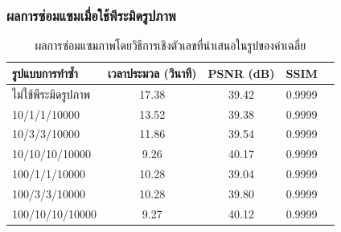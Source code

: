 \documentclass[xcolor=dvipsnames, xetex,serif]{beamer}
\numberwithin{equation}{section}
\begin{document}
    \begin{frame}
        \frametitle{ผลการซ่อมแซมเมื่อใช้พีระมิดรูปภาพ}
        \begin{table}[H]
            \centering
            \begin{tabular}[ht]{|l|c|c|c|c|}
                \hline
                รูปแบบการทำซ้ำ  & เวลาประมวล  (วินาที) & PSNR (dB) & SSIM \\
                \hline
                ไม่ใช้พีระมิดรูปภาพ & 17.38 & 39.42 & 0.9999 \\
                10/1/1/10000 & 13.52 & 39.38 & 0.9999 \\
                10/3/3/10000 & 11.86 & 39.54 & 0.9999 \\
                10/10/10/10000 & 9.26 & 40.17 & 0.9999\\
                100/1/1/10000 & 10.28 & 39.04 & 0.9999\\
                100/3/3/10000 & 10.28 & 39.80 & 0.9999\\
                100/10/10/10000 & 9.27 & 40.12 & 0.9999 \\
                \hline
            \end{tabular}
            \caption{ผลการซ่อมแซมภาพโดยวิธีการเชิงตัวเลขที่นำเสนอในรูปของค่าเฉลี่ย}
            \label{result:table-multiresolution1-summary}
        \end{table}	
    \end{frame}
\end{document}
